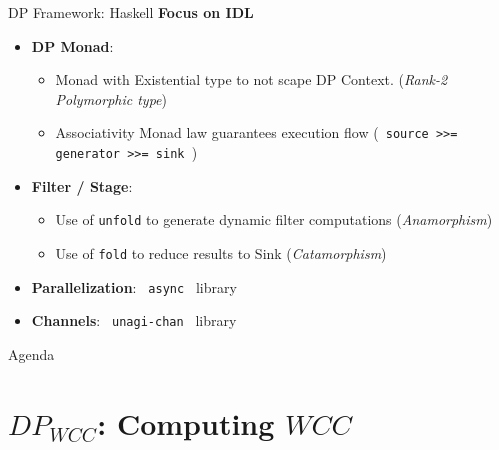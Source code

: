 \documentclass{beamer}
\begin{document}
  \begin{frame}[fragile]{DP Framework: Haskell}
    \textbf{Focus on IDL}

    \begin{block}

      \begin{itemize}
        \item \textbf{DP Monad}: 
        \begin{itemize}
          \item Monad with Existential type to not scape DP Context. (\textit{Rank-2 Polymorphic type})
          \item Associativity Monad law guarantees execution flow (\texttt{ source >>= generator >>= sink }) 
        \end{itemize}
        \item \textbf{Filter / Stage}: 
        \begin{itemize}
          \item Use of \texttt{unfold} to generate dynamic filter computations (\textit{Anamorphism})
          \item Use of \texttt{fold} to reduce results to Sink (\textit{Catamorphism})
        \end{itemize}
        \item \textbf{Parallelization}: \texttt{ async } library
        \item \textbf{Channels}: \texttt{ unagi-chan } library
      \end{itemize}
      
    \end{block}
  \end{frame}

  \begin{frame}{Agenda}
    \section{$DP_{WCC}$: Computing $WCC$}
    \tableofcontents[currentsection]
  \end{frame}
\end{document}
